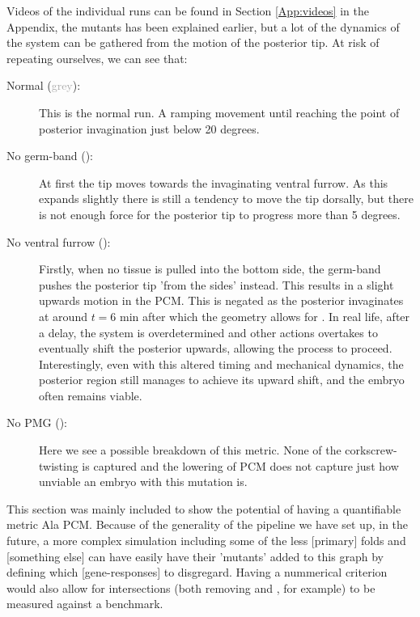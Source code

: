 \begin{figure}[H]
    \label{fig:PCM-mutants}
\end{figure}


Videos of the individual runs can be found in Section \ref{App:videos} in the Appendix, the mutants has been explained earlier, but a lot of the dynamics of the system can be gathered from the motion of the posterior tip. At risk of repeating ourselves, we can see that:\\
\begin{description}
    \item[Normal (\textcolor{darkgray}{grey}):] This is the normal run. A ramping movement until reaching the point of posterior invagination just below 20 degrees. 
    \item[No germ-band ():] At first the tip moves towards the invaginating ventral furrow. As this expands slightly there is still a tendency to move the tip dorsally, but there is not enough force for the posterior tip to progress more than 5 degrees. 
    \item[No ventral furrow ():] Firstly, when no tissue is pulled into the bottom side, the germ-band pushes the posterior tip 'from the sides' instead. This results in a slight upwards motion in the PCM. This is negated as the posterior invaginates at around $t=6\text{ min}$ after which the geometry allows for . In real life, after a delay, the system is overdetermined and other actions overtakes to eventually shift the posterior upwards, allowing the process to proceed. Interestingly, even with this altered timing and mechanical dynamics, the posterior region still manages to achieve its upward shift, and the embryo often remains viable. 
    \item[No PMG ():]  Here we see a possible breakdown of this metric. None of the corkscrew-twisting is captured and the lowering of PCM does not capture just how unviable an embryo with this mutation is.  
\end{description}

This section was mainly included to show the potential of having a quantifiable metric Ala PCM. Because of the generality of the pipeline we have set up, in the future, a more complex simulation including some of the less [primary] folds and [something else] can have easily have their 'mutants' added to this graph by defining which [gene-responses] to disgregard. Having a nummerical criterion would also allow for intersections (both removing  and , for example) to be measured against a benchmark. 


